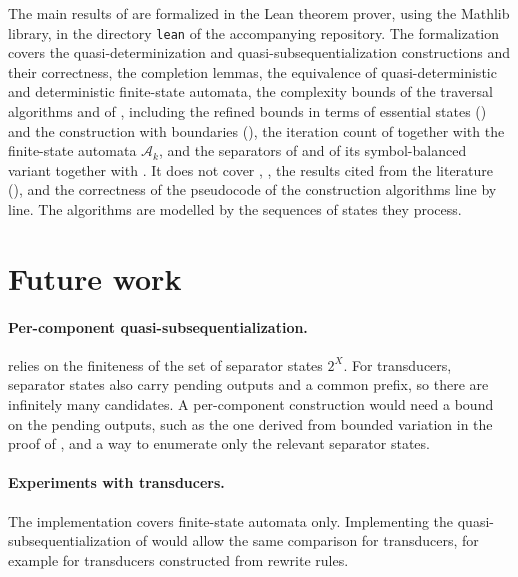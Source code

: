 The main results of 
are formalized in the Lean theorem prover, using the Mathlib library, in the directory
\texttt{lean} of the accompanying repository. The formalization covers the
quasi-determinization and quasi-subsequentialization constructions and their
correctness, the completion lemmas, the equivalence of quasi-deterministic and
deterministic finite-state automata, the complexity bounds of the traversal algorithms
and of , including the refined bounds in terms of
essential states () and
the construction with boundaries (), the
iteration count of
 together with the finite-state automata $\mathcal{A}_k$, and the
separators of  and of its symbol-balanced variant together with
. It does not cover ,
, the results cited
from the literature (), and the
correctness of the pseudocode of the construction algorithms line by line. The
algorithms are modelled by the sequences of states they process.

\section{Future work}

\paragraph{Per-component quasi-subsequentialization.}
 relies on the finiteness of the set of separator
states $2^X$. For transducers, separator states also carry pending outputs and a common
prefix, so there are infinitely many candidates. A per-component construction would
need a bound on the pending outputs, such as the one derived from bounded variation in
the proof of , and a way to enumerate only the relevant
separator states.

\paragraph{Experiments with transducers.}
The implementation covers finite-state automata only. Implementing the
quasi-subsequentialization of  would allow the
same comparison for transducers, for example for transducers constructed from rewrite
rules.

